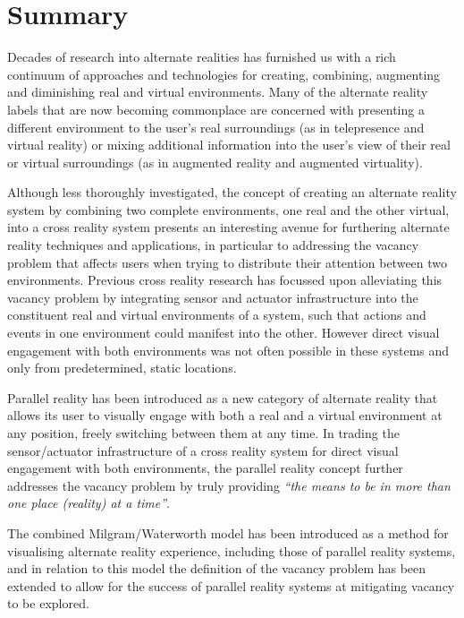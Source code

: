 


\section{Summary}
Decades of research into alternate realities has furnished us with a rich continuum of approaches and technologies for creating, combining, augmenting and diminishing real and virtual environments. Many of the alternate reality labels that are now becoming commonplace are concerned with presenting a different environment to the user's real surroundings (as in telepresence and virtual reality) or mixing additional information into the user's view of their real or virtual surroundings (as in augmented reality and augmented virtuality).

Although less thoroughly investigated, the concept of creating an alternate reality system by combining two complete environments, one real and the other virtual, into a cross reality system presents an interesting avenue for furthering alternate reality techniques and applications, in particular to addressing the vacancy problem that affects users when trying to distribute their attention between two environments. Previous cross reality research has focussed upon alleviating this vacancy problem by integrating sensor and actuator infrastructure into the constituent real and virtual environments of a system, such that actions and events in one environment could manifest into the other. However direct visual engagement with both environments was not often possible in these systems and only from predetermined, static locations.

Parallel reality has been introduced as a new category of alternate reality that allows its user to visually engage with both a real and a virtual environment at any position, freely switching between them at any time. In trading the sensor/actuator infrastructure of a cross reality system for direct visual engagement with both environments, the parallel reality concept further addresses the vacancy problem by truly providing \textit{``the means to be in more than one place (reality) at a time''}\cite{Lifton2007a}.

The combined Milgram/Waterworth model has been introduced as a method for visualising alternate reality experience, including those of parallel reality systems, and in relation to this model the definition of the vacancy problem has been extended to allow for the success of parallel reality systems at mitigating vacancy to be explored.